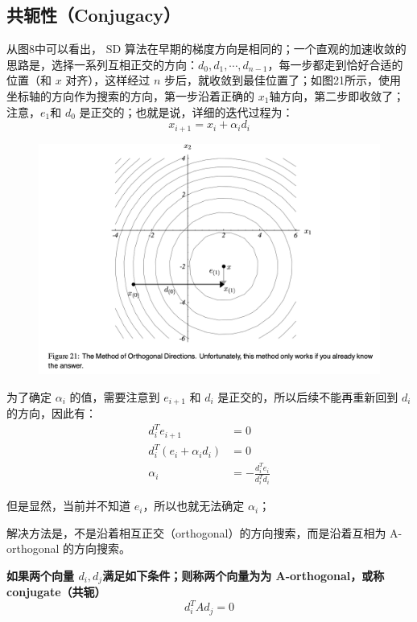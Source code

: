 \documentclass[12pt]{article}
\begin{document}
\subsection{共轭性（Conjugacy）}
从图8中可以看出， SD 算法在早期的梯度方向是相同的；一个直观的加速收敛的思路是，选择一系列互相正交的方向：$d_0, d_1, \cdots, d_{n-1}$，每一步都走到恰好合适的位置（和 $x$ 对齐），这样经过 $n$ 步后，就收敛到最佳位置了；如图21所示，使用坐标轴的方向作为搜索的方向，第一步沿着正确的 $x_1$轴方向，第二步即收敛了；注意，$e_1$和 $d_0$ 是正交的；也就是说，详细的迭代过程为：
$$
x_{i+1} = x_i + \alpha_i d_i
$$

\begin{figure}[H]
    \centering
    \includegraphics[width=1\textwidth]{fig/CG_Convergence_CD_1.png}
\end{figure}

为了确定 $\alpha_i$ 的值，需要注意到 $e_{i+1}$ 和 $d_i$ 是正交的，所以后续不能再重新回到 $d_i$ 的方向，因此有：
\begin{align*}
d^T_i e_{i+1} &= 0 \\
d^T_i(e_i + \alpha_i d_i) &= 0 \\
\alpha_i &= -\frac{d^T_ie_i}{d^T_id_i}
\end{align*}

但是显然，当前并不知道 $e_i$，所以也就无法确定 $\alpha_i$；

解决方法是，不是沿着相互正交（orthogonal）的方向搜索，而是沿着互相为 A-orthogonal 的方向搜索。

\textbf{如果两个向量 $d_i, d_j$满足如下条件；则称两个向量为为 A-orthogonal，或称 conjugate（共轭）}
$$
d_i^TAd_j = 0
$$
\end{document}
